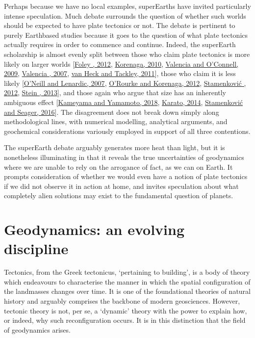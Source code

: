 \documentclass[letterpaper,10pt,english]{jupyterBook}
\begin{document}
\sphinxAtStartPar
Perhaps because we have no local examples, super\sphinxhyphen{}Earths have invited particularly intense speculation. Much debate surrounds the question of whether such worlds should be expected to have plate tectonics or not. The debate is pertinent to purely Earth\sphinxhyphen{}based studies because it goes to the question of what plate tectonics actually requires in order to commence and continue. Indeed, the super\sphinxhyphen{}Earth scholarship is almost evenly split between those who claim plate tectonics is more likely on larger worlds {[}\hyperlink{cite.references:id584}{Foley , 2012}, \hyperlink{cite.references:id336}{Korenaga, 2010}, \hyperlink{cite.references:id223}{Valencia and O'Connell, 2009}, \hyperlink{cite.references:id324}{Valencia , 2007}, \hyperlink{cite.references:id36}{van Heck and Tackley, 2011}{]}, those who claim it is less likely {[}\hyperlink{cite.references:id582}{O'Neill and Lenardic, 2007}, \hyperlink{cite.references:id583}{O'Rourke and Korenaga, 2012}, \hyperlink{cite.references:id334}{Stamenković , 2012}, \hyperlink{cite.references:id33}{Stein , 2013}{]}, and those again who argue that size has an inherently ambiguous effect {[}\hyperlink{cite.references:id452}{Kameyama and Yamamoto, 2018}, \hyperlink{cite.references:id43}{Karato, 2014}, \hyperlink{cite.references:id333}{Stamenković and Seager, 2016}{]}. The disagreement does not break down simply along methodological lines, with numerical modelling, analytical arguments, and geochemical considerations variously employed in support of all three contentions.

\sphinxAtStartPar
The super\sphinxhyphen{}Earth debate arguably generates more heat than light, but it is nonetheless illuminating in that it reveals the true uncertainties of geodynamics where we are unable to rely on the arrogance of fact, as we can on Earth. It prompts consideration of whether we would even have a notion of plate tectonics if we did not observe it in action at home, and invites speculation about what completely alien solutions may exist to the fundamental question of planets.


\section{Geodynamics: an evolving discipline}
\label{\detokenize{content/chapter_01_background/main:geodynamics-an-evolving-discipline}}
\sphinxAtStartPar
Tectonics, from the Greek tectonicus, ‘pertaining to building’, is a body of theory which endeavours to characterise the manner in which the spatial configuration of the landmasses changes over time. It is one of the foundational theories of natural history and arguably comprises the backbone of modern geosciences. However, tectonic theory is not, per se, a ‘dynamic’ theory with the power to explain how, or indeed, why such reconfiguration occurs. It is in this distinction that the field of geodynamics arises.
\end{document}
